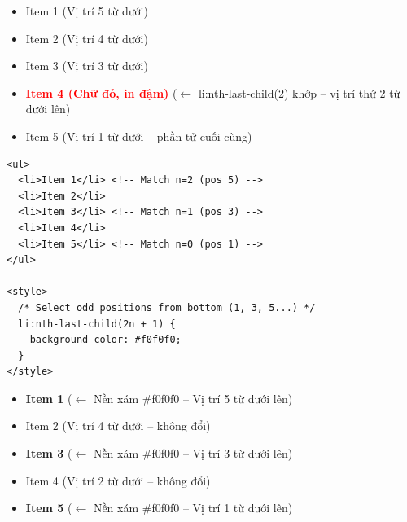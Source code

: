 \documentclass[11pt,oneside]{book}
\begin{document}
\begin{browserWindow}
\sffamily\small
\begin{itemize}[leftmargin=1.5em, itemsep=2pt, parsep=0pt]
    \item Item 1 {\scriptsize\textcolor{gray!60}{(Vị trí 5 từ dưới)}}
    \item Item 2 {\scriptsize\textcolor{gray!60}{(Vị trí 4 từ dưới)}}
    \item Item 3 {\scriptsize\textcolor{gray!60}{(Vị trí 3 từ dưới)}}
    \item \textcolor{red}{\textbf{Item 4 (Chữ đỏ, in đậm)}} {\scriptsize\textcolor{gray!60}{($\leftarrow$ li:nth-last-child(2) khớp -- vị trí thứ 2 từ dưới lên)}}
    \item Item 5 {\scriptsize\textcolor{gray!60}{(Vị trí 1 từ dưới -- phần tử cuối cùng)}}
\end{itemize}
\end{browserWindow}

\begin{codeWindow}
\begin{lstlisting}[language=HTML5]
<ul>
  <li>Item 1</li> <!-- Match n=2 (pos 5) -->
  <li>Item 2</li>
  <li>Item 3</li> <!-- Match n=1 (pos 3) -->
  <li>Item 4</li>
  <li>Item 5</li> <!-- Match n=0 (pos 1) -->
</ul>

<style>
  /* Select odd positions from bottom (1, 3, 5...) */
  li:nth-last-child(2n + 1) {
    background-color: #f0f0f0;
  }
</style>
\end{lstlisting}
\end{codeWindow}

\begin{browserWindow}
\sffamily\small
\begin{itemize}[leftmargin=1.5em, itemsep=3pt, parsep=0pt]
    \item \colorbox{gray!20}{\textbf{Item 1}} {\scriptsize\textcolor{gray!60}{($\leftarrow$ Nền xám \#f0f0f0 -- Vị trí 5 từ dưới lên)}}
    \item Item 2 {\scriptsize\textcolor{gray!60}{(Vị trí 4 từ dưới -- không đổi)}}
    \item \colorbox{gray!20}{\textbf{Item 3}} {\scriptsize\textcolor{gray!60}{($\leftarrow$ Nền xám \#f0f0f0 -- Vị trí 3 từ dưới lên)}}
    \item Item 4 {\scriptsize\textcolor{gray!60}{(Vị trí 2 từ dưới -- không đổi)}}
    \item \colorbox{gray!20}{\textbf{Item 5}} {\scriptsize\textcolor{gray!60}{($\leftarrow$ Nền xám \#f0f0f0 -- Vị trí 1 từ dưới lên)}}
\end{itemize}
\end{browserWindow}
\end{document}
